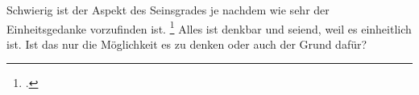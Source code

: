Schwierig ist der Aspekt des Seinsgrades je nachdem wie sehr der Einheitsgedanke vorzufinden ist. \footcite[vgl.][S. 99f.]{halfwassen2015spuren}
Alles ist denkbar und seiend, weil es einheitlich ist. 
Ist das nur die Möglichkeit es zu denken oder auch der Grund dafür?

